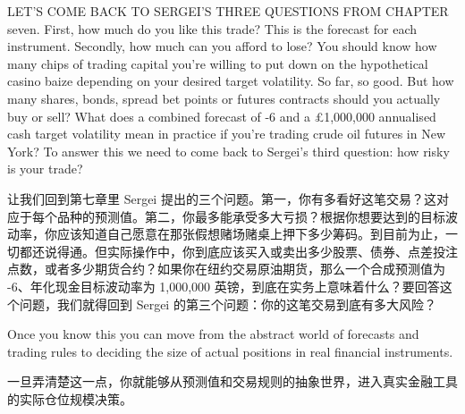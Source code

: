 
\begin{englishblock} LET'S COME BACK TO SERGEI'S THREE QUESTIONS FROM CHAPTER seven. First, how much do you like this trade? This is the forecast for each instrument. Secondly, how much can you afford to lose? You should know how many chips of trading capital you're willing to put down on the hypothetical casino baize depending on your desired target volatility. So far, so good. But how many shares, bonds, spread bet points or futures contracts should you actually buy or sell? What does a combined forecast of -6 and a £1,000,000 annualised cash target volatility mean in practice if you're trading crude oil futures in New York? To answer this we need to come back to Sergei's third question: how risky is your trade? \end{englishblock}

\begin{chineseblock}让我们回到第七章里 Sergei 提出的三个问题。第一，你有多看好这笔交易？这对应于每个品种的预测值。第二，你最多能承受多大亏损？根据你想要达到的目标波动率，你应该知道自己愿意在那张假想赌场赌桌上押下多少筹码。到目前为止，一切都还说得通。但实际操作中，你到底应该买入或卖出多少股票、债券、点差投注点数，或者多少期货合约？如果你在纽约交易原油期货，那么一个合成预测值为 -6、年化现金目标波动率为 1,000,000 英镑，到底在实务上意味着什么？要回答这个问题，我们就得回到 Sergei 的第三个问题：你的这笔交易到底有多大风险？\end{chineseblock}

\bipairgap

\begin{englishblock} Once you know this you can move from the abstract world of forecasts and trading rules to deciding the size of actual positions in real financial instruments. \end{englishblock}

\begin{chineseblock}一旦弄清楚这一点，你就能够从预测值和交易规则的抽象世界，进入真实金融工具的实际仓位规模决策。\end{chineseblock}


